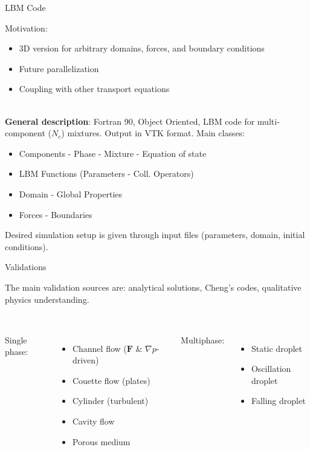 \documentclass{beamer}
\begin{document}
	\begin{frame}{LBM Code}
		
		Motivation: 
		\begin{itemize}
			\item 3D version for arbitrary domains, forces, and boundary conditions
			\item Future parallelization
			\item Coupling with other transport equations
		\end{itemize}
	
		~\\\textbf{General description}: Fortran 90, Object Oriented, LBM code for multi-component ($N_c$) mixtures. Output in VTK format. Main classes:
		\begin{itemize}
			\item Components - Phase - Mixture - Equation of state
			\item LBM Functions (Parameters - Coll. Operators) 
			\item Domain - Global Properties
			\item Forces - Boundaries
		\end{itemize}
		Desired simulation setup is given through input files (parameters, domain, initial conditions).
	\end{frame}
	
	\begin{frame}{Validations}
		
		The main validation sources are: analytical solutions, Cheng's codes, qualitative physics understanding.\\~\\

		
		\begin{columns}[T]
			
			Single phase:
			\begin{itemize}
				\item Channel flow ($\mathbf{F}$ \& $\nabla p$-driven)
				\item Couette flow (plates)
				\item Cylinder (turbulent)
				\item Cavity flow
				\item Porous medium
			\end{itemize}
			
			Multiphase:
			\begin{itemize}
				\item Static droplet
				\item Oscillation droplet
				\item Falling droplet
			\end{itemize}
		\end{columns}
	\end{frame}
\end{document}
